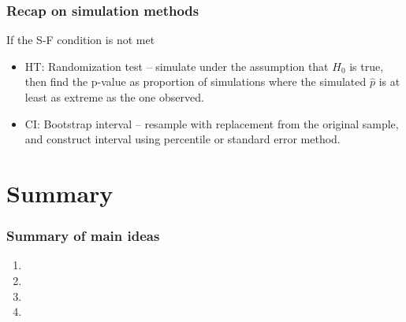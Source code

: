 \documentclass[11pt,containsverbatim,handout,xcolor=xelatex,dvipsnames,table]{beamer}
\begin{document}

\begin{frame}
\frametitle{Recap on simulation methods}

If the S-F condition is not met

\begin{itemize}

\item HT: Randomization test -- simulate under the assumption that $H_0$ is true, then find the p-value as proportion of simulations where the simulated $\hat{p}$ is at least as extreme as the one observed.

\item CI: Bootstrap interval -- resample with replacement from the original sample, and construct interval using percentile or standard error method.

\end{itemize}


\end{frame}


\section{Summary}


\begin{frame}
\frametitle{Summary of main ideas}

\vfill

\begin{enumerate}

\item {}

\item {}

\item {}

\item {}

\end{enumerate}

\vfill

\end{frame}

\end{document}
